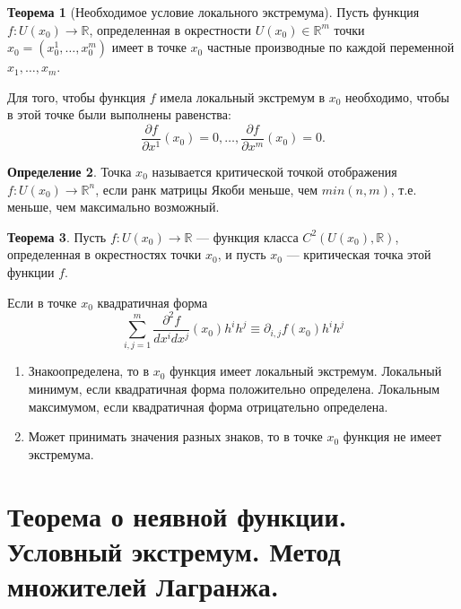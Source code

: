\documentclass[12pt]{report}
\theoremstyle{definition}
\newtheorem{theorem}{Теорема}[chapter]
\newtheorem{definition}[theorem]{Определение}
\newcommand{\R}{\mathbb R}
\begin{document}
\begin{theorem}[Необходимое условие локального экстремума]
Пусть функция $f: U(x_0) \rightarrow \R$, определенная в окрестности
$U(x_0) \in \R^m$ точки $x_0 = (x_0^1, \dots, x_0^m)$ имеет в точке
$x_0$ частные производные по каждой переменной $x_1, \dots, x_m$.

Для того, чтобы функция $f$ имела локальный экстремум в $x_0$ необходимо,
чтобы в этой точке были выполнены равенства:
$$
\dfrac{\partial f}{\partial x^1}(x_0) = 0, \dots, \dfrac{\partial f}{\partial x^m}(x_0) = 0.
$$
\end{theorem}

\begin{definition}
Точка $x_0$ называется критической точкой отображения $f: U(x_0) \rightarrow \R^n$,
если ранк матрицы Якоби меньше, чем $min(n, m)$, т.е. меньше, чем максимально возможный.
\end{definition}

\begin{theorem}
Пусть $f: U(x_0) \rightarrow \R$ --- функция класса $C^2(U(x_0), \R)$,
определенная в окрестностях точки $x_0$, и пусть $x_0$ --- критическая точка
этой функции $f$.

Если в точке $x_0$ квадратичная форма
$$
\sum\limits_{i, j=1}^m \dfrac{\partial^2 f}{dx^i dx^j} (x_0) h^i h^j
\equiv
\partial_{i, j} f(x_0) h^i h^j
$$

\begin{enumerate}
\item Знакоопределена, то в $x_0$ функция имеет локальный экстремум.
Локальный минимум, если квадратичная форма положительно определена.
Локальным максимумом, если квадратичная форма отрицательно определена.
\item Может принимать значения разных знаков, то в точке $x_0$ функция не имеет
экстремума.
\end{enumerate}

\end{theorem}


\section{Теорема о неявной функции. Условный экстремум. Метод множителей Лагранжа.}
\end{document}
